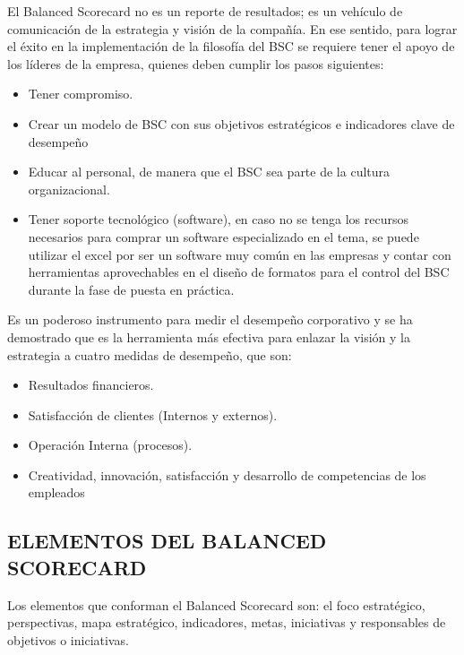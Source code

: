 	El Balanced Scorecard no es un reporte de resultados; es un vehículo de comunicación de la estrategia y visión de la compañía. En 		ese sentido, para lograr el éxito en la implementación de la filosofía del BSC se requiere tener el apoyo de los líderes de la 			empresa, quienes deben cumplir los pasos siguientes:

	\begin{itemize}

	\item 	Tener compromiso.
	\item  Crear un modelo de BSC con sus objetivos estratégicos e indicadores clave de desempeño
	\item  Educar al personal, de manera que el BSC sea parte de la cultura organizacional.
	\item  Tener soporte tecnológico (software), en caso no se tenga los recursos necesarios para comprar un software especializado en el tema, se puede utilizar el excel por ser un software muy común en las empresas y contar con herramientas aprovechables en el diseño de formatos para el control del BSC durante la fase de puesta en práctica.
	\end{itemize}

	Es un poderoso instrumento para medir el desempeño corporativo y se ha demostrado que es la herramienta más efectiva para enlazar la visión y la estrategia a cuatro medidas de desempeño, que son:

	\begin{itemize}
		\item Resultados financieros.
		\item Satisfacción de clientes (Internos y externos).
		\item Operación Interna (procesos).
		\item Creatividad, innovación, satisfacción y desarrollo de competencias de los empleados

	\end{itemize}

\subsection{ ELEMENTOS DEL BALANCED SCORECARD}

	Los elementos que conforman el Balanced Scorecard son: el foco estratégico, perspectivas, mapa estratégico, indicadores, metas, iniciativas y responsables de  objetivos o iniciativas.

